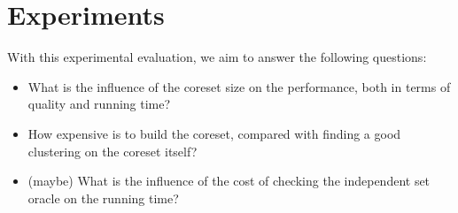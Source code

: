 \section{Experiments}

\newcommand{\data}[1]{\texttt{#1}}

With this experimental evaluation, we aim to answer the following questions:
\begin{itemize}
    \item What is the influence of the coreset size on the performance, 
        both in terms of quality and running time?
    \item How expensive is to build the coreset, compared with finding
        a good clustering on the coreset itself?
    \item (maybe) What is the influence of the cost of checking the independent set oracle
        on the running time?
\end{itemize}


